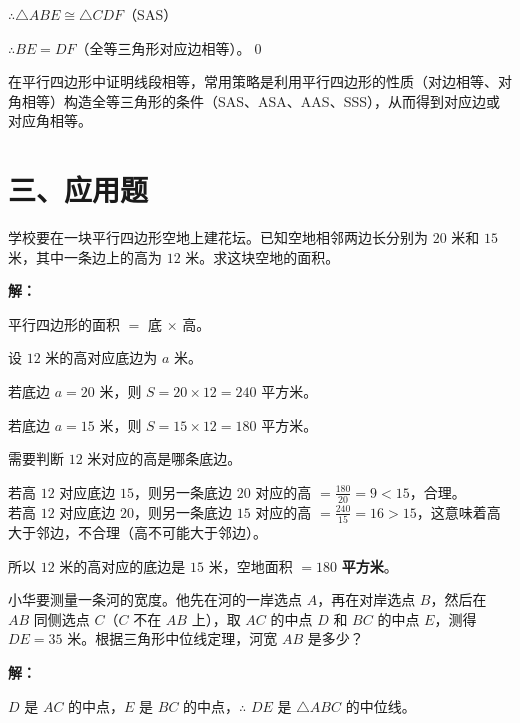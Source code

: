 \documentclass[12pt, a4paper]{ctexart}
\begin{document}
$\therefore \triangle ABE \cong \triangle CDF$（SAS）

$\therefore BE = DF$（全等三角形对应边相等）。\qed

\begin{tipbox}[方法总结]
在平行四边形中证明线段相等，常用策略是利用平行四边形的性质（对边相等、对角相等）构造全等三角形的条件（SAS、ASA、AAS、SSS），从而得到对应边或对应角相等。
\end{tipbox}

\section*{\textcolor{apppurple}{三、应用题}}

\begin{appbox}
学校要在一块平行四边形空地上建花坛。已知空地相邻两边长分别为 $20$ 米和 $15$ 米，其中一条边上的高为 $12$ 米。求这块空地的面积。
\end{appbox}

\textbf{解：}

平行四边形的面积 $=$ 底 $\times$ 高。

设 $12$ 米的高对应底边为 $a$ 米。

若底边 $a = 20$ 米，则 $S = 20 \times 12 = 240$ 平方米。

若底边 $a = 15$ 米，则 $S = 15 \times 12 = 180$ 平方米。

需要判断 $12$ 米对应的高是哪条底边。

若高 $12$ 对应底边 $15$，则另一条底边 $20$ 对应的高 $= \frac{180}{20} = 9 < 15$，合理。\\
若高 $12$ 对应底边 $20$，则另一条底边 $15$ 对应的高 $= \frac{240}{15} = 16 > 15$，这意味着高大于邻边，不合理（高不可能大于邻边）。

所以 $12$ 米的高对应的底边是 $15$ 米，空地面积 $= \boxed{180}$ \textbf{平方米}。

\vspace{6pt}

\begin{appbox}
小华要测量一条河的宽度。他先在河的一岸选点 $A$，再在对岸选点 $B$，然后在 $AB$ 同侧选点 $C$（$C$ 不在 $AB$ 上），取 $AC$ 的中点 $D$ 和 $BC$ 的中点 $E$，测得 $DE = 35$ 米。根据三角形中位线定理，河宽 $AB$ 是多少？
\end{appbox}

\textbf{解：}

$D$ 是 $AC$ 的中点，$E$ 是 $BC$ 的中点，$\therefore$ $DE$ 是 $\triangle ABC$ 的中位线。
\end{document}
